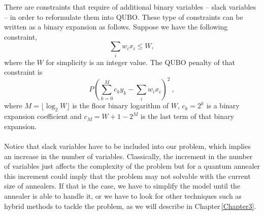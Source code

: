 There are constraints that require of additional binary variables -- slack variables -- in order to reformulate them into QUBO. These type of constraints can be written as a binary expansion as follows. Suppose we have the following constraint,
\begin{equation}
    \sum_{i}w_{i}x_{i}\leq W,
\end{equation}
where the $W$ for simplicity is an integer value. The QUBO penalty of that constraint is
\begin{equation}
    P \left(\sum_{k=0}^{M}c_{k}y_{k} - \sum_{i}w_{i}x_{i} \right)^{2}\ , 
\end{equation}
where $M = \lfloor\log_{2}{W}\rfloor$ is the floor binary logarithm of $W$, $c_{k} = 2^{k}$ is a binary expansion coefficient and $c_{M} = W + 1 - 2^{M}$ is the last term of that binary expansion. \\\\
Notice that slack variables have to be included into our problem, which implies an increase in the number of variables. Classically, the increment in the number of variables just affects the complexity of the problem but for a quantum annealer this increment could imply that the problem may not solvable with the current size of annealers. If that is the case, we have to simplify the model until the annealer is able to handle it, or we have to look for other techniques such as hybrid methods to tackle the problem, as we will describe in Chapter\,\ref{Chapter3}.

